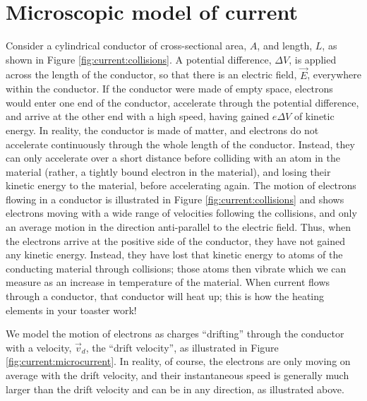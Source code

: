 \section{Microscopic model of current}
\label{sec:current:micromodel}
Consider a cylindrical conductor of cross-sectional area, $A$, and length, $L$, as shown in Figure \ref{fig:current:collisions}. A potential difference, $\Delta V$, is applied across the length of the conductor, so that there is an electric field, $\vec E$, everywhere within the conductor. If the conductor were made of empty space, electrons would enter one end of the conductor, accelerate through the potential difference, and arrive at the other end with a high speed, having gained $e\Delta V$ of kinetic energy. In reality, the conductor is made of matter, and electrons do not accelerate continuously through the whole length of the conductor. Instead, they can only accelerate over a short distance before colliding with an atom in the material (rather, a tightly bound electron in the material), and losing their kinetic energy to the material, before accelerating again. The motion of electrons flowing in a conductor is illustrated in Figure \ref{fig:current:collisions} and shows electrons moving with a wide range of velocities following the collisions, and only an average motion in the direction anti-parallel to the electric field.
Thus, when the electrons arrive at the positive side of the conductor, they have not gained any kinetic energy. Instead, they have lost that kinetic energy to atoms of the conducting material through collisions; those atoms then vibrate which we can measure as an increase in temperature of the material. When current flows through a conductor, that conductor will heat up; this is how the heating elements in your toaster work!


We model the motion of electrons as charges ``drifting'' through the conductor with a velocity, $\vec v_d$, the ``drift velocity'', as illustrated in Figure \ref{fig:current:microcurrent}. In reality, of course, the electrons are only moving on average with the drift velocity, and their instantaneous speed is generally much larger than the drift velocity and can be in any direction, as illustrated above. 


